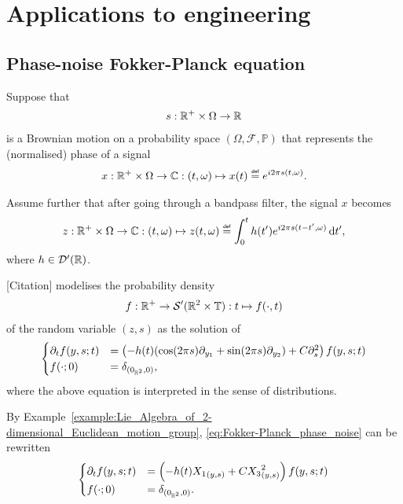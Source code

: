 \section{Applications to engineering}

\subsection{Phase-noise Fokker-Planck equation}

Suppose that
\begin{align*}
    s : \mathbb{R}^+ \times \Omega \to \mathbb{R}
\end{align*}
is a Brownian motion on a probability space $(\Omega, \mathcal F, \mathbb P)$
that represents the (normalised) phase of a signal
\begin{align*}
    x : \R^+ \times \Omega \to \C : (t, \omega) \mapsto x(t) \defeq \e^{\i \turn s(t, \omega)}.
\end{align*}

Assume further that after going through a bandpass filter,
the signal $x$ becomes
\begin{align*}
    z : \R^+ \times \Omega \to \C : (t, \omega) \mapsto z(t, \omega) \defeq \int_0^t h(t') \e^{\i \turn s(t - t', \omega)} \dd t',
\end{align*}
where $h \in {\mathcal{D}' (\mathbb{R})}$.

[Citation] modelises the probability density
\begin{align*}
    f : \mathbb{R}^+ \to {\mathcal{S}' (\mathbb{R}^2 \times \mathbb{T})} : t \mapsto f(\cdot, t)
\end{align*}
of the random variable $(z, s)$ as the solution of
\begin{align}
    \begin{cases}
        \D{1}[f]{t}(y, s; t) &= \left(-h(t) (\cos (\turn s) \D{1}{{y_1} } + \sin(\turn s) \D{1}{{y_2} }) + C \D{2}{s^2}\right) f(y, s; t)\\
        f(\dummy; 0) &= \DiracDelta{(0_{\R^2}, 0)},
    \end{cases}
    \label{eq:Fokker-Planck_phase_noise}
\end{align}
where the above equation is interpreted in the sense of distributions.

By Example~\ref{example:Lie_Algebra_of_2-dimensional_Euclidean_motion_group},
\eqref{eq:Fokker-Planck_phase_noise} can be rewritten
\begin{align}
    \begin{cases}
        \D{1}[f]{t}(y, s; t) &= \left(-h(t) \LeftDifferentialOperatorFirstOrder {X_1}_{(y, s)} + C \LeftDifferentialOperatorFirstOrder {X_3}^2_{(y, s)}\right) f(y, s; t)\\
        f(\dummy; 0) &= \DiracDelta{(0_{\R^2}, 0)}.
    \end{cases}
    \label{eq:Fokker-Planck_phase_noise:left-invariant_operators}
\end{align}

